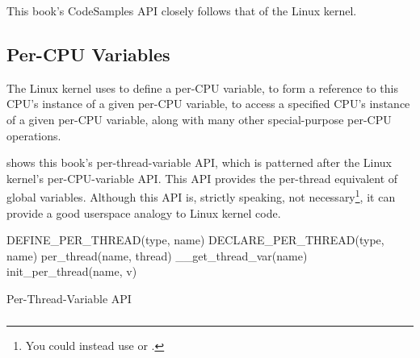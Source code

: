 This book's CodeSamples API closely follows that of the Linux kernel.

\subsection{Per-CPU Variables}
\label{sec:toolsoftrade:Per-CPU Variables}

The Linux kernel uses  to define a per-CPU variable,
 to form a reference to this CPU's instance of a
given per-CPU variable,  to access a specified CPU's
instance of a given per-CPU variable, along with many other special-purpose
per-CPU operations.

shows this book's per-thread-variable API, which is patterned
after the Linux kernel's per-CPU-variable API\@.
This API provides the per-thread equivalent of global variables.
Although this API is, strictly speaking, not necessary\footnote{
	You could instead use  or .},
it can provide a good userspace analogy to Linux kernel code.

\begin{listing}
\begin{VerbatimL}[numbers=none]
DEFINE_PER_THREAD(type, name)
DECLARE_PER_THREAD(type, name)
per_thread(name, thread)
__get_thread_var(name)
init_per_thread(name, v)
\end{VerbatimL}
\caption{Per-Thread-Variable API}
\label{lst:toolsoftrade:Per-Thread-Variable API}
\end{listing}

\QuickQuizEnd

\subsubsection{}

